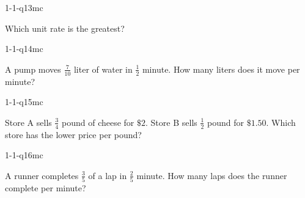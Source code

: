 \begin{practiceQuestion}{1-1-q13}{mc}
\begin{questionText}
Which unit rate is the greatest?
\end{questionText}
\end{practiceQuestion}

\begin{practiceQuestion}{1-1-q14}{mc}
\begin{questionText}
A pump moves $\frac{7}{10}$ liter of water in $\frac{1}{2}$ minute. How many liters does it move per minute?
\end{questionText}
\end{practiceQuestion}

\begin{practiceQuestion}{1-1-q15}{mc}
\begin{questionText}
Store A sells $\frac{3}{4}$ pound of cheese for $\$2$. Store B sells $\frac{1}{2}$ pound for $\$1.50$. Which store has the lower price per pound?
\end{questionText}
\end{practiceQuestion}

\begin{practiceQuestion}{1-1-q16}{mc}
\begin{questionText}
A runner completes $\frac{3}{5}$ of a lap in $\frac{2}{5}$ minute. How many laps does the runner complete per minute?
\end{questionText}
\end{practiceQuestion}

